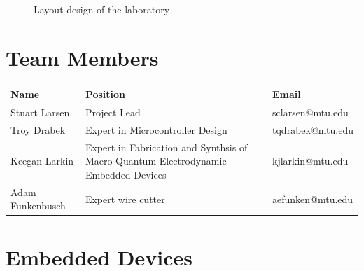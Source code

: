 \documentclass[12pt]{article}
\begin{document}
\begin{figure}[h]
  \centering
  \label{fig:layout}
  \caption{Layout design of the laboratory}
\end{figure}



\section{Team Members}
\begin{center}
  \begin{tabular}{  l | p{8cm} | l }
    Name & Position & Email \\
    \hline
    Stuart Larsen & Project Lead & sclarsen@mtu.edu \\ 
    Troy Drabek & Expert in Microcontroller Design & tqdrabek@mtu.edu \\
    Keegan Larkin & Expert in Fabrication and Synthsis of Macro Quantum Electrodynamic Embedded Devices  & kjlarkin@mtu.edu \\
    Adam Funkenbusch & Expert wire cutter & aefunken@mtu.edu \\

  \end{tabular}
\end{center}

\section{Embedded Devices}
\end{document}
